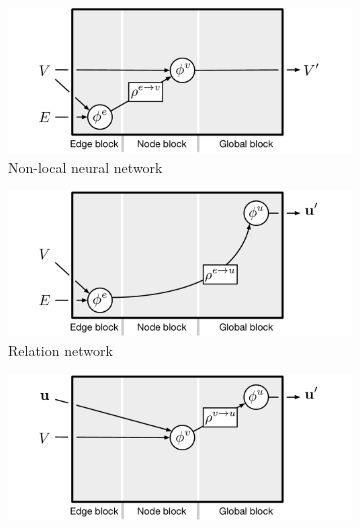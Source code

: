 \begin{figure}[t!]
\begin{subfigure}[b]{0.49\textwidth}
        \label{fig:gn-mpnn-block}
    \end{subfigure}
    \hspace{0.2em}
    \begin{subfigure}[b]{0.49\textwidth}
        \includegraphics[width=\textwidth]{figures/GN-nlnn-block}
        \caption{Non-local neural network}
        \label{fig:gn-nlnn-block}
    \end{subfigure}
    \par\bigskip
    \begin{subfigure}[b]{0.49\textwidth}
        \includegraphics[width=\textwidth]{figures/GN-rn-block}
        \caption{Relation network}
        \label{fig:gn-rn-block}
    \end{subfigure}
    \hspace{0.2em}
    \begin{subfigure}[b]{0.49\textwidth}
        \includegraphics[width=\textwidth]{figures/GN-deep-sets-block}

\end{subfigure}
\end{figure}
